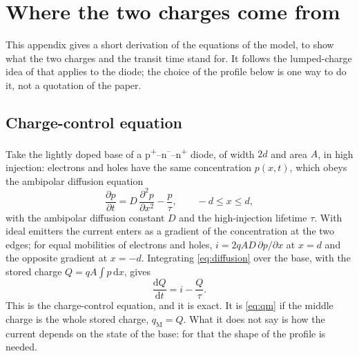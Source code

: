 \documentclass[10pt,a4paper]{scrartcl}
\newcommand{\qM}{q_\mathrm{M}}
\newcommand{\diff}{\mathrm{d}}
\begin{document}
\appendix
\section{Where the two charges come from}
\label{app:lumped}
This appendix gives a short derivation of the equations of the model, to show what the two charges and the transit time stand for. It follows the lumped-charge idea of \cite{linvill1958} that \cite{lauritzen1991} applies to the diode; the choice of the profile below is one way to do it, not a quotation of the paper.

\subsection*{Charge-control equation}
Take the lightly doped base of a p\textsuperscript{+}--n\textsuperscript{--}--n\textsuperscript{+} diode, of width $2d$ and area $A$, in high injection: electrons and holes have the same concentration $p(x,t)$, which obeys the ambipolar diffusion equation
\begin{equation}
\frac{\partial p}{\partial t} = D\,\frac{\partial^2 p}{\partial x^2} - \frac{p}{\tau} , \qquad -d \leq x \leq d ,
\label{eq:diffusion}
\end{equation}
with the ambipolar diffusion constant $D$ and the high-injection lifetime $\tau$. With ideal emitters the current enters as a gradient of the concentration at the two edges; for equal mobilities of electrons and holes, $i = 2qAD\,\partial p/\partial x$ at $x = d$ and the opposite gradient at $x = -d$. Integrating \eqref{eq:diffusion} over the base, with the stored charge $Q = qA\int p\,\diff x$, gives
\begin{equation}
\frac{\diff Q}{\diff t} = i - \frac{Q}{\tau} .
\label{eq:cc}
\end{equation}
This is the charge-control equation, and it is exact. It is \eqref{eq:qm} if the middle charge is the whole stored charge, $\qM = Q$. What it does not say is how the current depends on the state of the base: for that the shape of the profile is needed.
\end{document}
